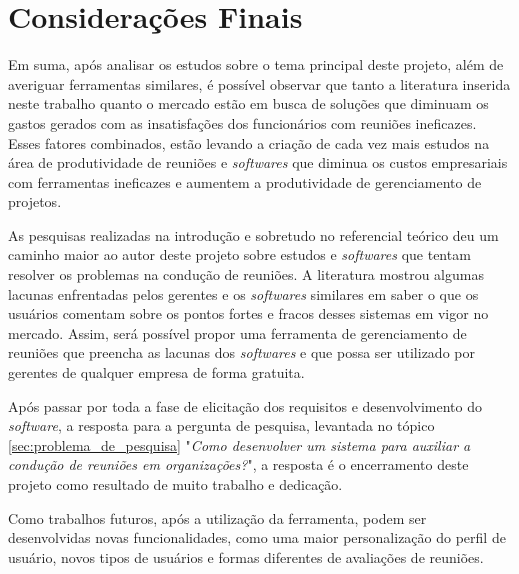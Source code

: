 \chapter{Considerações Finais}
\label{cp:consideracoes}

Em suma, após analisar os estudos sobre o tema principal deste projeto, além de averiguar ferramentas similares, é possível observar que tanto a literatura inserida neste trabalho quanto o mercado estão em busca de soluções que diminuam os gastos gerados com as insatisfações dos funcionários com reuniões ineficazes. Esses fatores combinados, estão levando a criação de cada vez mais estudos na área de produtividade de reuniões e \textit{softwares} que diminua os custos empresariais com ferramentas ineficazes e aumentem a produtividade de gerenciamento de projetos.

As pesquisas realizadas na introdução e sobretudo no referencial teórico deu um caminho maior ao autor deste projeto sobre estudos e \textit{softwares} que tentam resolver os problemas na condução de reuniões. A literatura mostrou algumas lacunas enfrentadas pelos gerentes e os \textit{softwares} similares em saber o que os usuários comentam sobre os pontos fortes e fracos desses sistemas em vigor no mercado. Assim, será possível propor uma ferramenta de gerenciamento de reuniões que preencha as lacunas dos \textit{softwares} e que possa ser utilizado por gerentes de qualquer empresa de forma gratuita.

Após passar por toda a fase de elicitação dos requisitos e desenvolvimento do \textit{software}, a resposta para a pergunta de pesquisa, levantada no tópico \ref{sec:problema_de_pesquisa} "\textit{Como desenvolver um sistema para auxiliar a condução de reuniões em organizações?}", a resposta é o encerramento deste projeto como resultado de muito trabalho e dedicação. 

Como trabalhos futuros, após a utilização da ferramenta, podem ser desenvolvidas novas funcionalidades, como uma maior personalização do perfil de usuário, novos tipos de usuários e formas diferentes de avaliações de reuniões.